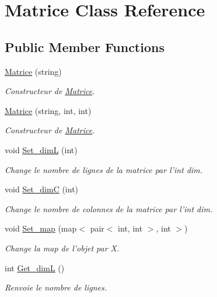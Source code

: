 \hypertarget{class_matrice}{\section{Matrice Class Reference}
\label{class_matrice}
}
\subsection*{Public Member Functions}
\begin{DoxyCompactItemize}
\item 
\hyperlink{class_matrice_a2960355d096a3415ca1e49cbf26a211b}{Matrice} (string)
\begin{DoxyCompactList}\small\item\em Constructeur de \hyperlink{class_matrice}{Matrice}. \end{DoxyCompactList}\item 
\hyperlink{class_matrice_a5e67677bc4ec3e776030920a140b5e45}{Matrice} (string, int, int)
\begin{DoxyCompactList}\small\item\em Constructeur de \hyperlink{class_matrice}{Matrice}. \end{DoxyCompactList}\item 
void \hyperlink{class_matrice_adf18304a72b2e828d99bfe4e1d0ce748}{Set\-\_\-dim\-L} (int)
\begin{DoxyCompactList}\small\item\em Change le nombre de lignes de la matrice par l'int dim. \end{DoxyCompactList}\item 
void \hyperlink{class_matrice_a69305eca1fab66d359d683bd036aa4dc}{Set\-\_\-dim\-C} (int)
\begin{DoxyCompactList}\small\item\em Change le nombre de colonnes de la matrice par l'int dim. \end{DoxyCompactList}\item 
void \hyperlink{class_matrice_a752aaa50023c03f41ac68c795b2ae211}{Set\-\_\-map} (map$<$ pair$<$ int, int $>$, int $>$)
\begin{DoxyCompactList}\small\item\em Change la map de l'objet par X. \end{DoxyCompactList}\item 
int \hyperlink{class_matrice_ae312a978bd106c90dfd2216ebfd031df}{Get\-\_\-dim\-L} ()
\begin{DoxyCompactList}\small\item\em Renvoie le nombre de lignes. \end{DoxyCompactList}\item 

\end{DoxyCompactItemize}
